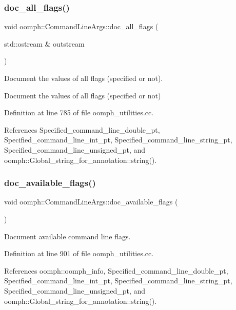 \subsubsection{\texorpdfstring{doc\+\_\+all\+\_\+flags()}{doc\_all\_flags()}}
{\footnotesize\ttfamily void oomph\+::\+Command\+Line\+Args\+::doc\+\_\+all\+\_\+flags (\begin{DoxyParamCaption}\item[{std\+::ostream \&}]{outstream }\end{DoxyParamCaption})}



Document the values of all flags (specified or not). 

Document the values of all flags (specified or not) 

Definition at line 785 of file oomph\+\_\+utilities.\+cc.



References Specified\+\_\+command\+\_\+line\+\_\+double\+\_\+pt, Specified\+\_\+command\+\_\+line\+\_\+int\+\_\+pt, Specified\+\_\+command\+\_\+line\+\_\+string\+\_\+pt, Specified\+\_\+command\+\_\+line\+\_\+unsigned\+\_\+pt, and oomph\+::\+Global\+\_\+string\+\_\+for\+\_\+annotation\+::string().

\mbox{\label{namespaceoomph_1_1CommandLineArgs_a17dcadc5a258d8ea6e72c5527961a6eb}} 
\subsubsection{\texorpdfstring{doc\+\_\+available\+\_\+flags()}{doc\_available\_flags()}}
{\footnotesize\ttfamily void oomph\+::\+Command\+Line\+Args\+::doc\+\_\+available\+\_\+flags (\begin{DoxyParamCaption}{ }\end{DoxyParamCaption})}



Document available command line flags. 



Definition at line 901 of file oomph\+\_\+utilities.\+cc.



References oomph\+::oomph\+\_\+info, Specified\+\_\+command\+\_\+line\+\_\+double\+\_\+pt, Specified\+\_\+command\+\_\+line\+\_\+int\+\_\+pt, Specified\+\_\+command\+\_\+line\+\_\+string\+\_\+pt, Specified\+\_\+command\+\_\+line\+\_\+unsigned\+\_\+pt, and oomph\+::\+Global\+\_\+string\+\_\+for\+\_\+annotation\+::string().



